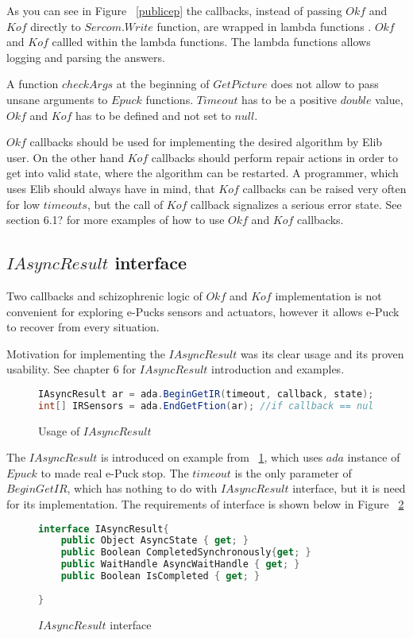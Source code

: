 	As you can see in Figure ~\ref{publicep} the callbacks, instead of passing $Okf$ and $Kof$  directly to 
	$Sercom.Write$ function, are wrapped in lambda functions \cite{lambda}.
	$Okf$ and $Kof$  callled within the lambda functions.
	The lambda functions allows logging and parsing the answers.

	A function $checkArgs$ at the beginning of $GetPicture$ does not allow to pass unsane arguments
	to $Epuck$ functions. $Timeout$ has to be a positive $double$ value, $Okf$ and $Kof$ has to be defined
	and not set to $null$.

	$Okf$ callbacks should be used for implementing the desired algorithm by Elib user.
	On the other hand $Kof$ callbacks should perform repair actions in order to get into valid state,
	where the algorithm can be restarted. A programmer, which uses Elib should always have in mind,
	that $Kof$ callbacks can be raised very often for low $timeouts$,
	but the call of $Kof$ callback signalizes a serious error state.
	See  section 6.1? for more examples of how to use $Okf$ and $Kof$ callbacks.


\subsection{$IAsyncResult$ interface} \label{sec:iasync}
	Two callbacks and schizophrenic logic of $Okf$ and $Kof$ implementation is not
	convenient for exploring e-Pucks sensors and actuators, 
	however it allows e-Puck to recover from every situation.

	Motivation for implementing the $IAsyncResult$ was its clear usage and its proven usability.
	See chapter 6 for $IAsyncResult$ introduction and examples.
	\begin{figure}[!hbp]
\begin{lstlisting}[language=cs]
IAsyncResult ar = ada.BeginGetIR(timeout, callback, state);            
int[] IRSensors = ada.EndGetFtion(ar); //if callback == null
\end{lstlisting}
	\caption{Usage of $IAsyncResult$}\label{arexample}
	\end{figure}

	The $IAsyncResult$ is introduced on example from ~\ref{arexample}, which uses $ada$ instance
	of $Epuck$ to made real e-Puck stop. The $timeout$ is the only parameter of $BeginGetIR$,
	which has nothing to do with $IAsyncResult$ interface, but it is need for its implementation.
	The requirements of interface is shown below in Figure ~\ref{interface}
	\begin{figure}[!hbp]
\begin{lstlisting}[language=cs]
interface IAsyncResult{
	public Object AsyncState { get; }
	public Boolean CompletedSynchronously{get; } 
	public WaitHandle AsyncWaitHandle { get; }
	public Boolean IsCompleted { get; }
	
}
\end{lstlisting}
	\caption{$IAsyncResult$ interface}\label{interface}
	\end{figure}

